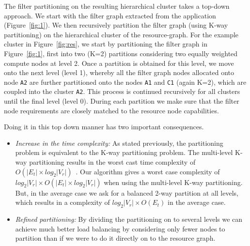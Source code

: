 The filter partitioning on the resulting hierarchical cluster takes a
top-down approach. We start with the filter graph extracted from the
application (Figure~\ref{fig:1}). We then recursively partition the filter
graph (using K-way partitioning) on the hierarchical cluster of the
resource-graph. For the example cluster in Figure~\ref{fig:res}, we
start by partitioning the filter graph in Figure~\ref{fig:1}, first into
two (K=2) partitions considering two equally weighted compute nodes at
level 2. Once a partition is obtained for this level, we move onto the
next level (level 1), whereby all the filter graph nodes allocated onto
node \texttt{A2} are further partitioned onto the nodes \texttt{A1} and
\texttt{C1} (again K=2), which are coupled into the cluster
\texttt{A2}. This process is continued recursively for all clusters until the
final level (level 0). During each partition we make
sure that the filter node requirements are closely matched to the resource
node capabilities.


Doing it in this top down manner has two important consequences.

\begin{itemize}

\item \textit{Increase in the time complexity:} As stated previously,
  the partitioning problem is equivalent to the K-way partitioning
  problem. The multi-level K-way partitioning results in the worst cast
  time complexity of $O(|E_t| \times log_2|V_r|)$~\cite{gkar98}. Our
  algorithm gives a worst case complexity of \mbox{$log_2|V_r| \times
    O(|E_t| \times log_2 |V_r|)$} when using the multi-level K-way
  partitioning. But, in the average case we ask for a balanced 2-way
  partition at all levels, which results in a complexity of $log_2 |V_r|
  \times O (E_t)$ in the average case.

\item \textit{Refined partitioning:} By dividing the partitioning on to several
  levels we can achieve much better load balancing by considering only
  fewer nodes to partition than if we were to do it directly on to the
  resource graph. %

\end{itemize}


